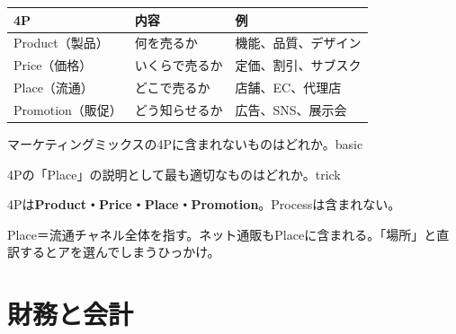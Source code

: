 \mondaipage
{}

\begin{keypoint}
\begin{tabularx}{\textwidth}{lXl}
  \toprule
  \textbf{4P} & \textbf{内容} & \textbf{例} \\
  \midrule
  Product（製品） & 何を売るか & 機能、品質、デザイン \\
  Price（価格） & いくらで売るか & 定価、割引、サブスク \\
  Place（流通） & どこで売るか & 店舗、EC、代理店 \\
  Promotion（販促） & どう知らせるか & 広告、SNS、展示会 \\
  \bottomrule
\end{tabularx}
\end{keypoint}


\begin{mondai}{マーケティングミックスの4Pに含まれないものはどれか。}{basic}
\end{mondai}

\begin{mondai}{4Pの「Place」の説明として最も適切なものはどれか。}{trick}
\end{mondai}

\kaitoupage

\begin{kaisetsu}
4Pは\textbf{Product・Price・Place・Promotion}。Processは含まれない。
\end{kaisetsu}

\begin{kaisetsu}
Place＝流通チャネル全体を指す。ネット通販もPlaceに含まれる。「場所」と直訳するとアを選んでしまうひっかけ。
\end{kaisetsu}


\section{財務と会計}

